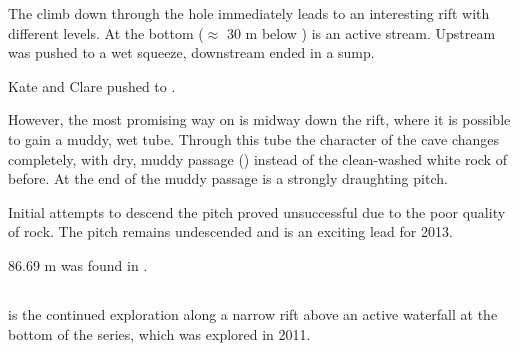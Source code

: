 The climb down through the hole immediately leads to an interesting rift
with different levels. At the bottom ($\approx$ 30 m below
) is an active stream. Upstream was pushed to a
wet squeeze, downstream ended in a sump.

\begin{marginfigure}
\checkoddpage \ifoddpage \forcerectofloat \else \forceversofloat \fi
\centering
 \caption{Kate and Clare pushed  to . }
 \label{kate clare lasko}
\end{marginfigure}

However, the most promising way on is midway down the rift, where it is
possible to gain a muddy, wet tube. Through this tube the character of
the cave changes completely, with dry, muddy passage () instead
of the clean-washed white rock of before. At the end of the muddy
passage is a strongly draughting pitch.

Initial attempts to descend the pitch proved unsuccessful due to the
poor quality of rock. The pitch remains undescended and is an exciting
lead for 2013.

86.69 m was found in .


\subsection{}

 is the continued exploration along a narrow rift above
an active waterfall at the bottom of the  series,
which was explored in 2011.

